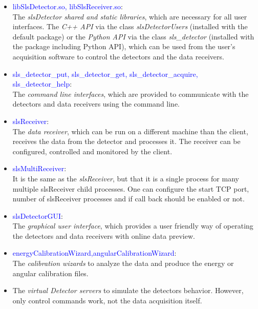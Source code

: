 \documentclass{article}
\begin{document}
\begin{itemize}

\item \textcolor{blue}{libSlsDetector.so, libSlsReceiver.so}:\\
The \textit{slsDetector shared and static libraries}, which are
necessary for all user interfaces. The \textit{C++ API} via the class
\textit{slsDetectorUsers} (installed with the default package) or the
\textit{Python API} via the class \textit{sls\_detector} (installed with the
package including Python API), which can be used from the user's acquisition
software to control the detectors and the data receivers.

\item \textcolor{blue}{sls\_detector\_put, sls\_detector\_get,
sls\_detector\_acquire, sls\_detector\_help}: \\
The \textit{command line interfaces}, which are provided to communicate with the
detectors and data receivers using the command line.

\item \textcolor{blue}{slsReceiver}: \\
The \textit{data receiver}, which can be run on a different machine than the
client, receives the data from the detector and processes it. The receiver can
be configured, controlled and monitored by the client.

\item \textcolor{blue}{slsMultiReceiver}: \\
It is the same as the \textit{slsReceiver}, but that it is a single process 
for many multiple slsReceiver child processes. One can configure the start TCP port,
number of slsReceiver processes and if call back should be enabled or not.

\item \textcolor{blue}{slsDetectorGUI}: \\
The \textit{graphical user interface}, which provides a user friendly way
of operating the detectors and data receivers with online data preview.

\item \textcolor{blue}{energyCalibrationWizard,angularCalibrationWizard}: \\
The \textit{calibration wizards} to analyze the data and produce the energy or
angular calibration files.

\item The \textit{virtual Detector servers} to simulate the detectors behavior.
However, only control commands work, not the data acquisition itself.
\end{itemize}
\end{document}
